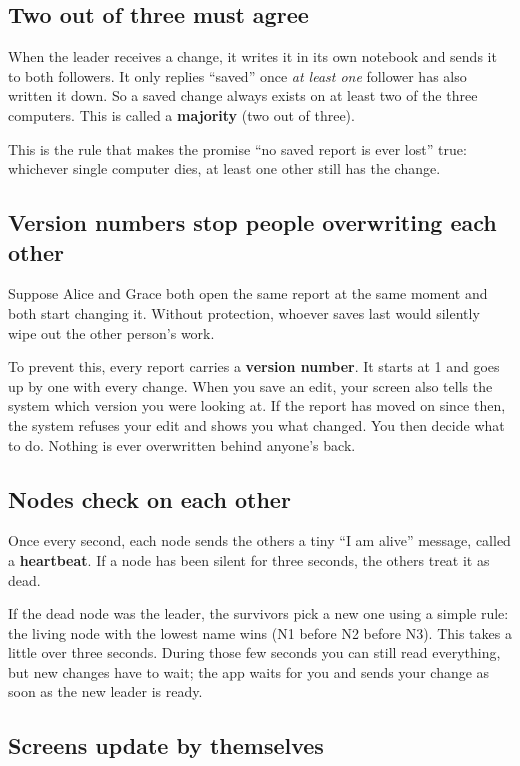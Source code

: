 \documentclass[11pt,a4paper]{article}
\newcommand{\term}[1]{\textbf{\textcolor{accent}{#1}}}
\begin{document}
\subsection{Two out of three must agree}

When the leader receives a change, it writes it in its own notebook and sends it to both
followers. It only replies ``saved'' once \emph{at least one} follower has also written it down.
So a saved change always exists on at least two of the three computers. This is called a
\term{majority} (two out of three).

This is the rule that makes the promise ``no saved report is ever lost'' true: whichever single
computer dies, at least one other still has the change.

\subsection{Version numbers stop people overwriting each other}

Suppose Alice and Grace both open the same report at the same moment and both start changing it.
Without protection, whoever saves last would silently wipe out the other person's work.

To prevent this, every report carries a \term{version number}. It starts at 1 and goes up by one
with every change. When you save an edit, your screen also tells the system which version you
were looking at. If the report has moved on since then, the system refuses your edit and shows
you what changed. You then decide what to do. Nothing is ever overwritten behind anyone's back.

\subsection{Nodes check on each other}

Once every second, each node sends the others a tiny ``I am alive'' message, called a
\term{heartbeat}. If a node has been silent for three seconds, the others treat it as dead.

If the dead node was the leader, the survivors pick a new one using a simple rule: the living
node with the lowest name wins (N1 before N2 before N3). This takes a little over three seconds.
During those few seconds you can still read everything, but new changes have to wait; the app
waits for you and sends your change as soon as the new leader is ready.

\subsection{Screens update by themselves}
\end{document}
